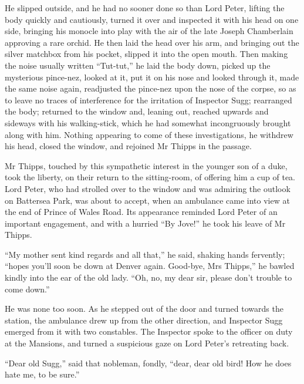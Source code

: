 He slipped outside, and he had no sooner done so than Lord Peter, lifting the body quickly and cautiously, turned it over and inspected it with his head on one side, bringing his monocle into play with the air of the late Joseph Chamberlain approving a rare orchid. He then laid the head over his arm, and bringing out the silver matchbox from his pocket, slipped it into the open mouth. Then making the noise usually written \enquote{Tut-tut,} he laid the body down, picked up the mysterious pince-nez, looked at it, put it on his nose and looked through it, made the same noise again, readjusted the pince-nez upon the nose of the corpse, so as to leave no traces of interference for the irritation of Inspector Sugg; rearranged the body; returned to the window and, leaning out, reached upwards and sideways with his walking-stick, which he had somewhat incongruously brought along with him. Nothing appearing to come of these investigations, he withdrew his head, closed the window, and rejoined Mr Thipps in the passage.

Mr Thipps, touched by this sympathetic interest in the younger son of a duke, took the liberty, on their return to the sitting-room, of offering him a cup of tea. Lord Peter, who had strolled over to the window and was admiring the outlook on Battersea Park, was about to accept, when an ambulance came into view at the end of Prince of Wales Road. Its appearance reminded Lord Peter of an important engagement, and with a hurried \enquote{By Jove!} he took his leave of Mr Thipps.

\enquote{My mother sent kind regards and all that,} he said, shaking hands fervently; \enquote{hopes you’ll soon be down at Denver again. Good-bye, Mrs Thipps,} he bawled kindly into the ear of the old lady. \enquote{Oh, no, my dear sir, please don’t trouble to come down.}

He was none too soon. As he stepped out of the door and turned towards the station, the ambulance drew up from the other direction, and Inspector Sugg emerged from it with two constables. The Inspector spoke to the officer on duty at the Mansions, and turned a suspicious gaze on Lord Peter’s retreating back.

\enquote{Dear old Sugg,} said that nobleman, fondly, \enquote{dear, dear old bird! How he does hate me, to be sure.}
